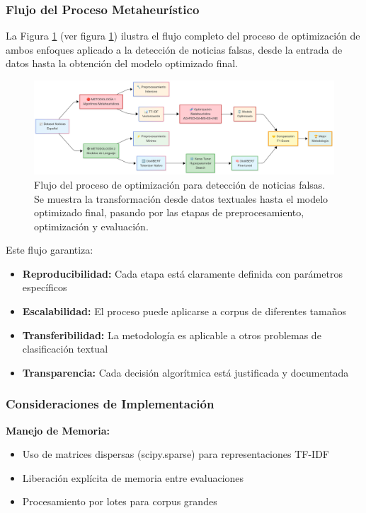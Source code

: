 \subsubsection{Flujo del Proceso Metaheurístico}

La Figura \ref{fig:flujo_metaheuristicas} (ver figura \ref{fig:flujo_metaheuristicas}) ilustra el flujo completo del proceso de optimización de ambos enfoques aplicado a la detección de noticias falsas, desde la entrada de datos hasta la obtención del modelo optimizado final.

\begin{figure}[h!]
    \centering
    \includegraphics[width=\textwidth]{Imagenes/figura2Flujo.png}
    \caption{Flujo del proceso de optimización para detección de noticias falsas. Se muestra la transformación desde datos textuales hasta el modelo optimizado final, pasando por las etapas de preprocesamiento, optimización y evaluación.}
    \label{fig:flujo_metaheuristicas}
\end{figure}

Este flujo garantiza:
\begin{itemize}
    \item \textbf{Reproducibilidad:} Cada etapa está claramente definida con parámetros específicos
    \item \textbf{Escalabilidad:} El proceso puede aplicarse a corpus de diferentes tamaños
    \item \textbf{Transferibilidad:} La metodología es aplicable a otros problemas de clasificación textual
    \item \textbf{Transparencia:} Cada decisión algorítmica está justificada y documentada
\end{itemize}

\subsubsection{Consideraciones de Implementación}

\textbf{Manejo de Memoria:}
\begin{itemize}
    \item Uso de matrices dispersas (scipy.sparse) para representaciones TF-IDF
    \item Liberación explícita de memoria entre evaluaciones
    \item Procesamiento por lotes para corpus grandes
\end{itemize}

